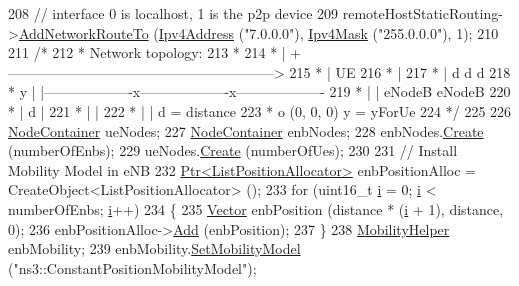 \begin{DoxyCode}
208   \textcolor{comment}{// interface 0 is localhost, 1 is the p2p device}
209   remoteHostStaticRouting->\hyperlink{classns3_1_1Ipv4StaticRouting_a8bf5eaa7ba49fe33c78c70d5560b6c39}{AddNetworkRouteTo} (\hyperlink{classns3_1_1Ipv4Address}{Ipv4Address} (\textcolor{stringliteral}{"7.0.0.0"}), 
      \hyperlink{classns3_1_1Ipv4Mask}{Ipv4Mask} (\textcolor{stringliteral}{"255.0.0.0"}), 1);
210 
211   \textcolor{comment}{/*}
212 \textcolor{comment}{   * Network topology:}
213 \textcolor{comment}{   *}
214 \textcolor{comment}{   *      |     + --------------------------------------------------------->}
215 \textcolor{comment}{   *      |     UE}
216 \textcolor{comment}{   *      |}
217 \textcolor{comment}{   *      |               d                   d                   d}
218 \textcolor{comment}{   *    y |     |-------------------x-------------------x-------------------}
219 \textcolor{comment}{   *      |     |                 eNodeB              eNodeB}
220 \textcolor{comment}{   *      |   d |}
221 \textcolor{comment}{   *      |     |}
222 \textcolor{comment}{   *      |     |                                             d = distance}
223 \textcolor{comment}{   *            o (0, 0, 0)                                   y = yForUe}
224 \textcolor{comment}{   */}
225 
226   \hyperlink{classns3_1_1NodeContainer}{NodeContainer} ueNodes;
227   \hyperlink{classns3_1_1NodeContainer}{NodeContainer} enbNodes;
228   enbNodes.\hyperlink{classns3_1_1NodeContainer_a787f059e2813e8b951cc6914d11dfe69}{Create} (numberOfEnbs);
229   ueNodes.\hyperlink{classns3_1_1NodeContainer_a787f059e2813e8b951cc6914d11dfe69}{Create} (numberOfUes);
230 
231   \textcolor{comment}{// Install Mobility Model in eNB}
232   \hyperlink{classns3_1_1Ptr}{Ptr<ListPositionAllocator>} enbPositionAlloc = 
      CreateObject<ListPositionAllocator> ();
233   \textcolor{keywordflow}{for} (uint16\_t \hyperlink{bernuolliDistribution_8m_a6f6ccfcf58b31cb6412107d9d5281426}{i} = 0; \hyperlink{bernuolliDistribution_8m_a6f6ccfcf58b31cb6412107d9d5281426}{i} < numberOfEnbs; \hyperlink{bernuolliDistribution_8m_a6f6ccfcf58b31cb6412107d9d5281426}{i}++)
234     \{
235       \hyperlink{classns3_1_1Vector3D_a7e59b47bc94c9cb1dadff68c1d0112d8}{Vector} enbPosition (distance * (\hyperlink{bernuolliDistribution_8m_a6f6ccfcf58b31cb6412107d9d5281426}{i} + 1), distance, 0);
236       enbPositionAlloc->\hyperlink{classns3_1_1ListPositionAllocator_a460e82f015ac012a73ba0ea0cccb3486}{Add} (enbPosition);
237     \}
238   \hyperlink{classns3_1_1MobilityHelper}{MobilityHelper} enbMobility;
239   enbMobility.\hyperlink{classns3_1_1MobilityHelper_a030275011b6f40682e70534d30280aba}{SetMobilityModel} (\textcolor{stringliteral}{"ns3::ConstantPositionMobilityModel"});

\end{DoxyCode}
